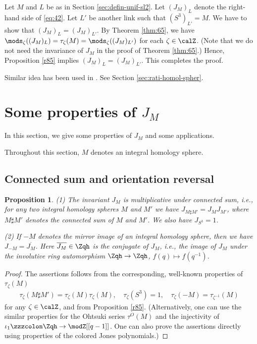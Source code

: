 \documentclass{amsart}
\numberwithin{equation}{section}
\numberwithin{figure}{section}
\theoremstyle{plain}
\newtheorem{proposition}[theorem]{Proposition}
\theoremstyle{definition}
\theoremstyle{remark}
\begin{document}
Let $M$ and $L$ be as in Section \ref{sec:defin-unif-sl2}.  Let
$(J_M)_L$ denote the right-hand side of \eqref{eq:42}.  Let $L'$ be
another link such that $(S^3)_{L'}=M$.  We have to show that
$(J_M)_L=(J_M)_{L'}$.  By Theorem \ref{thm:65}, we have
$\mods _\zeta ((J_M)_L)=\tau _\zeta (M)=\mods _\zeta ((J_M)_{L'})$ for each $\zeta \in \calZ$.
(Note that we do not need the invariance of $J_M$ in the proof of
Theorem \ref{thm:65}.)  Hence, Proposition \ref{r85} implies
$(J_M)_L=(J_M)_{L'}$.  This completes the proof.

Similar idea has been used in \cite{Beliakova-Blanchet-Le,Le4}.  See
Section \ref{sec:rati-homol-spher}.

\section{Some properties of $J_M$}
\label{sec12}

In this section, we give some properties of $J_M$ and some
applications.

Throughout this section, $M$ denotes an integral homology sphere.

\subsection{Connected sum and orientation reversal}
\label{sec:conn-sum-orient}

\begin{proposition}
  \label{thm:43}
  (1) The invariant $J_M$ is multiplicative under connected sum, i.e.,
  for any two integral homology spheres $M$ and $M'$ we have
  $J_{M\sharp M'}=J_M J_{M'}$, where $M\sharp M'$ denotes the connected sum of
  $M$ and $M'$.  We also have $J_{S^3}=1$.

  (2) If $-M$ denotes the mirror image of an integral homology sphere,
  then we have $J_{-M}=\overline{J_M}$.  Here $\overline{J_M}\in \Zqh$
  is the conjugate of $J_M$, i.e., the image of $J_M$ under the
  involutive ring automorphism $\Zqh\rightarrow \Zqh$, $f(q)\mapsto f(q^{-1})$.
\end{proposition}

\begin{proof}
  The assertions follows from the corresponding, well-known properties
  of $\tau _\zeta (M)$
  \begin{gather*}
    \tau _\zeta (M\sharp M')=\tau _\zeta (M)\tau _\zeta (M),\quad
    \tau _\zeta (S^3)=1,\quad
    \tau _\zeta (-M)=\tau _{\zeta ^{-1}}(M)
  \end{gather*}
  for any $\zeta \in \calZ$, and from Proposition \ref{r85}.  (Alternatively,
  one can use the similar properties for the Ohtsuki series $\tau ^O(M)$
  and the injectivity of $\iota _1\zzzcolon \Zqh\rightarrow \modZ [[q-1]]$.  One can also prove
  the assertions directly using properties of the colored Jones
  polynomials.)
\end{proof}
\end{document}
